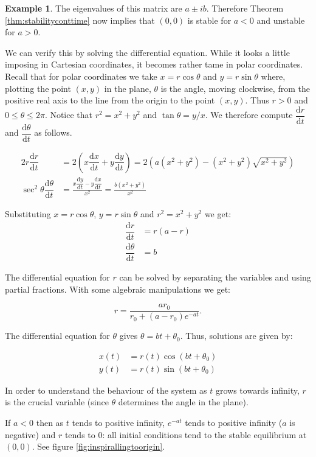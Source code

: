 \documentclass[
  a4paper,
  oneside,
  final]{krantz}
\renewcommand{\d}{\mathrm{d}}
\newcommand{\der}[2]{\dfrac{\d #1}{\d #2}}
\theoremstyle{definition}
\theoremstyle{definition}
\newtheorem{example}{Example}[chapter]
\theoremstyle{definition}
\theoremstyle{definition}
\theoremstyle{remark}
\begin{document}
\begin{example}
The eigenvalues of this matrix are \(a \pm i b\). Therefore Theorem \ref{thm:stabilityconttime} now implies that \((0,0)\) is stable for \(a < 0\) and unstable for \(a >0\).

We can verify this by solving the differential equation. While it looks a little imposing in Cartesian coordinates, it becomes rather tame in polar coordinates. Recall that for polar coordinates we take \(x = r \cos \theta\) and \(y= r \sin \theta\) where, plotting the point \((x,y)\) in the plane, \(\theta\) is the angle, moving clockwise, from the positive real axis to the line from the origin to the point \((x,y)\). Thus \(r>0\) and \(0 \le \theta \le 2 \pi\). Notice that \(r^2 = x^2 + y^2\) and \(\tan \theta = y/x\). We therefore compute \(\der{r}{t}\) and \(\der{\theta}{t}\) as follows.

\begin{align*}
2r\der{r}{t} &= 2\left(x \der{x}{t} + y \der{y}{t}\right) = 2\left(a(x^2 + y^2) - (x^2 + y^2)\sqrt{x^2 + y^2}\right)\\
\sec^2 \theta \der{\theta}{t} &= \frac{x \der{y}{t} - y \der{x}{t}}{x^2} = \frac{b(x^2 + y^2)}{x^2}
\end{align*}

Substituting \(x = r \cos \theta\), \(y= r \sin \theta\) and \(r^2 = x^2 + y^2\) we get: \begin{align*}
 \der{r}{t} &= r (a - r) \\
\der{\theta}{t} &=  b
\end{align*}

The differential equation for \(r\) can be solved by separating the variables and using partial fractions. With some algebraic manipulations we get:

\[ r =  \frac{a r_0}{r_0 + (a-r_0)e^{-at}}.\]

The differential equation for \(\theta\) gives \(\theta = b t + \theta_0\). Thus, solutions are given by:

\begin{align*}
x(t) &= r(t) \cos(bt + \theta_0) \\
y(t) &=  r(t) \sin(bt + \theta_0)
\end{align*}

In order to understand the behaviour of the system as \(t\) grows towards infinity, \(r\) is the crucial variable (since \(\theta\) determines the angle in the plane).

If \(a< 0\) then as \(t\) tends to positive infinity, \(e^{-at}\) tends to positive infinity (\(a\) is negative) and \(r\) tends to \(0\): all initial conditions tend to the stable equilibrium at \((0,0)\). See figure \ref{fig:inspirallingtoorigin}.


\end{example}
\end{document}
